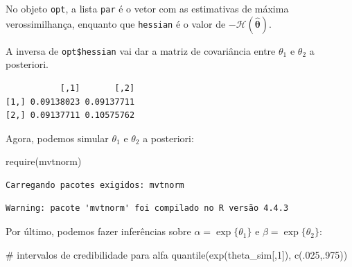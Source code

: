 \documentclass[
  letterpaper,
  DIV=11,
  numbers=noendperiod]{scrreprt}
\newenvironment{Shaded}{\begin{snugshade}}{\end{snugshade}}
\newcommand{\CommentTok}[1]{\textcolor[rgb]{0.37,0.37,0.37}{#1}}
\newcommand{\DecValTok}[1]{\textcolor[rgb]{0.68,0.00,0.00}{#1}}
\newcommand{\FunctionTok}[1]{\textcolor[rgb]{0.28,0.35,0.67}{#1}}
\newcommand{\NormalTok}[1]{\textcolor[rgb]{0.00,0.23,0.31}{#1}}
\newcommand{\OtherTok}[1]{\textcolor[rgb]{0.00,0.23,0.31}{#1}}
\newcommand{\SpecialCharTok}[1]{\textcolor[rgb]{0.37,0.37,0.37}{#1}}
\theoremstyle{definition}
\theoremstyle{definition}
\theoremstyle{plain}
\theoremstyle{remark}
\begin{document}
No objeto \texttt{opt}, a lista \texttt{par} é o vetor com as
estimativas de máxima verossimilhança, enquanto que \texttt{hessian} é o
valor de \(-\mathcal{H}(\hat{\boldsymbol{\theta}})\).

A inversa de \texttt{opt\$hessian} vai dar a matriz de covariância entre
\(\theta_1\) e \(\theta_2\) a posteriori.

\begin{Shaded}
\end{Shaded}

\begin{verbatim}
           [,1]       [,2]
[1,] 0.09138023 0.09137711
[2,] 0.09137711 0.10575762
\end{verbatim}

Agora, podemos simular \(\theta_1\) e \(\theta_2\) a posteriori:

\begin{Shaded}
\begin{Highlighting}[]
\FunctionTok{require}\NormalTok{(mvtnorm)}
\end{Highlighting}
\end{Shaded}

\begin{verbatim}
Carregando pacotes exigidos: mvtnorm
\end{verbatim}

\begin{verbatim}
Warning: pacote 'mvtnorm' foi compilado no R versão 4.4.3
\end{verbatim}

\begin{Shaded}
\end{Shaded}

Por último, podemos fazer inferências sobre \(\alpha=\exp\{\theta_1\}\)
e \(\beta=\exp\{\theta_2\}\):

\begin{Shaded}
\begin{Highlighting}[]
\CommentTok{\# intervalos de credibilidade para alfa}
\FunctionTok{quantile}\NormalTok{(}\FunctionTok{exp}\NormalTok{(theta\_sim[,}\DecValTok{1}\NormalTok{]), }\FunctionTok{c}\NormalTok{(.}\DecValTok{025}\NormalTok{,.}\DecValTok{975}\NormalTok{))}
\end{Highlighting}
\end{Shaded}
\end{document}
